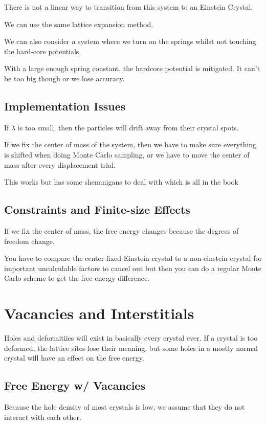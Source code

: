 \documentclass[fleqn]{report}
\begin{document}
There is not a linear way to transition from this system to an Einstein Crystal.

We can use the same lattice expansion method. 

We can also consider a system where we turn on the springs whilst not touching 
the hard-core potentials. 

With a large enough spring constant, the hardcore potential is mitigated.
It can't be too big though or we lose accuracy. 

\subsection{Implementation Issues}
If $\lambda$ is too small, then the particles will drift away from their 
crystal spots. 

If we fix the center of mass of the system, then we have to make sure everything is 
shifted when doing Monte Carlo sampling, or we have to move the center of mass 
after every displacement trial. 

This works but has some shenanigans to deal with which is all in the book 

\subsection{Constraints and Finite-size Effects}
If we fix the center of mass, the free energy changes because the 
degrees of freedom change. 

You have to compare the center-fixed Einstein crystal to a non-einstein 
crystal for important uncalculable factors to cancel out but then 
you can do a regular Monte Carlo scheme to get the free energy difference.

\section{Vacancies and Interstitials}
Holes and deformitiies will exist in basically every crystal ever. If 
a crystal is too deformed, the lattice sites lose their meaning, but some holes 
in a mostly normal crystal will have an effect on the free energy. 

\subsection{Free Energy w/ Vacancies}
Because the hole density of most crystals is low, we assume that they 
do not interact with each other. 
\end{document}
